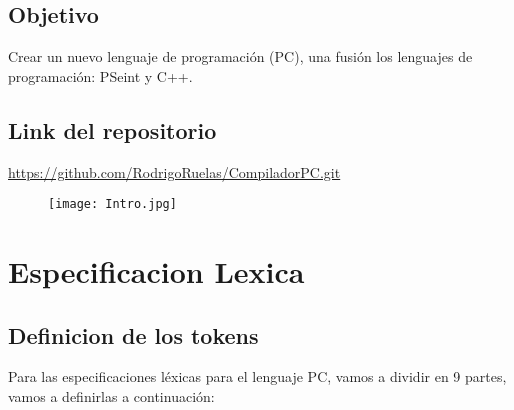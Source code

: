 \documentclass{article}
\begin{document}
\subsection{Objetivo}
Crear un nuevo lenguaje de programación (PC), una fusión los lenguajes de programación: PSeint y C++.
\subsection{Link del repositorio}
\item \url{https://github.com/RodrigoRuelas/CompiladorPC.git}

\vspace{0.5cm}

\begin{figure}[htbp]
    \centering
    \texttt{[image: Intro.jpg]}
    \label{fig:ejemplo}
\end{figure}

\newpage %

\section{Especificacion Lexica}
\subsection{Definicion de los tokens}
Para las especificaciones léxicas para el lenguaje PC, vamos a dividir en 9 partes, vamos a definirlas a continuación:
\end{document}
